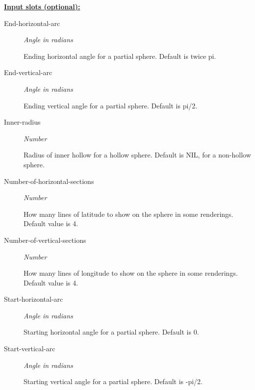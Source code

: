 \documentclass [11pt]{book}
\begin{document}
\begin{itemize}
\textbf{
\underline{Input slots (optional):}}

\begin{description}

\item [End-horizontal-arc]
\emph{Angle in radians}

 Ending horizontal angle for a partial sphere. Default is twice pi.




\item [End-vertical-arc]
\emph{Angle in radians}

 Ending vertical angle for a partial sphere. Default is pi/2.




\item [Inner-radius]
\emph{Number}

 Radius of inner hollow for a hollow sphere. Default is NIL, for a non-hollow sphere.




\item [Number-of-horizontal-sections]
\emph{Number}

 How many lines of latitude to show on the sphere in some renderings. Default value is 4.




\item [Number-of-vertical-sections]
\emph{Number}

 How many lines of longitude to show on the sphere in some renderings. Default value is 4.




\item [Start-horizontal-arc]
\emph{Angle in radians}

 Starting horizontal angle for a partial sphere. Default is 0.




\item [Start-vertical-arc]
\emph{Angle in radians}

 Starting vertical angle for a partial sphere. Default is -pi/2.




\end{description}







\end{itemize}
\end{document}

